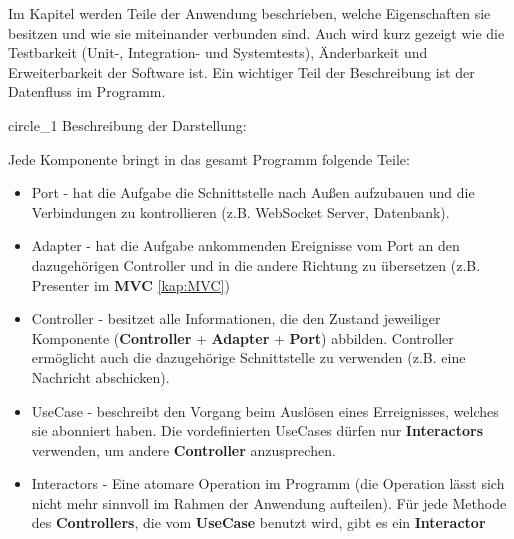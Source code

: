 Im Kapitel werden Teile der Anwendung beschrieben, welche Eigenschaften sie besitzen und wie sie miteinander verbunden sind.
Auch wird kurz gezeigt wie die Testbarkeit (Unit-, Integration- und Systemtests), 
Änderbarkeit und Erweiterbarkeit der Software ist.    
Ein wichtiger Teil der Beschreibung ist der Datenfluss im Programm.

{circle_1}
Beschreibung der Darstellung:

Jede Komponente bringt in das gesamt Programm folgende Teile:
\begin{itemize}
    \item Port - hat die Aufgabe die Schnittstelle nach Außen aufzubauen und die Verbindungen zu kontrollieren (z.B. WebSocket Server, Datenbank).
    \item Adapter  - hat die Aufgabe ankommenden Ereignisse vom Port an den dazugehörigen Controller und in die andere Richtung zu übersetzen (z.B. Presenter im \textbf{MVC} \ref{kap:MVC})
    \item Controller - besitzet alle Informationen, die den Zustand jeweiliger Komponente (\textbf{Controller} + \textbf{Adapter} + \textbf{Port}) abbilden.
    Controller ermöglicht auch die dazugehörige Schnittstelle zu verwenden (z.B. eine Nachricht abschicken).
    \item UseCase - beschreibt den Vorgang beim Auslösen eines Erreignisses, welches sie abonniert haben. Die
    vordefinierten UseCases dürfen nur \textbf{Interactors} verwenden, um andere \textbf{Controller} anzusprechen.
    \item Interactors - Eine atomare Operation im Programm (die Operation lässt sich nicht mehr sinnvoll im Rahmen
    der Anwendung aufteilen). Für jede Methode des \textbf{Controllers}, die vom \textbf{UseCase} benutzt wird, gibt es ein \textbf{Interactor}
\end{itemize}
